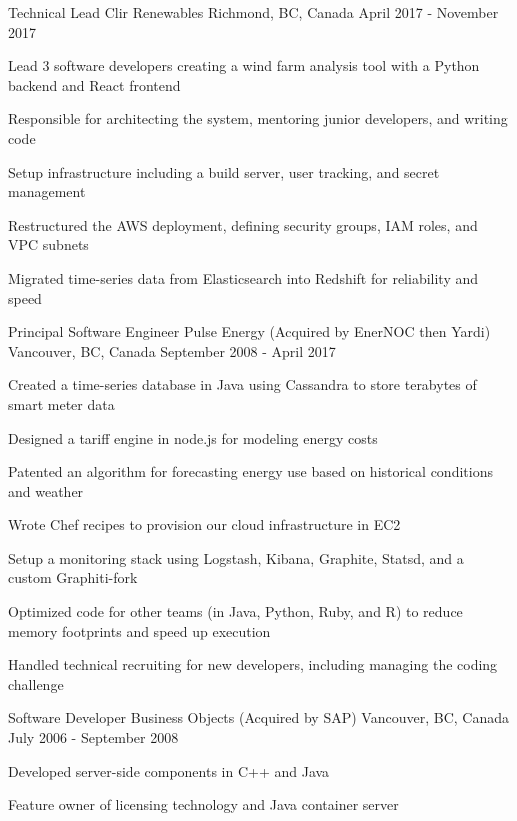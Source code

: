 \begin{cventries}
  \cventry
    {Technical Lead} %
    {Clir Renewables} %
    {Richmond, BC, Canada} %
    {April 2017 - November 2017} %
    {
      \begin{cvitems} %
        \item {Lead 3 software developers creating a wind farm analysis tool with a Python backend and React frontend}
        \item {Responsible for architecting the system, mentoring junior developers, and writing code}
        \item {Setup infrastructure including a build server, user tracking, and secret management}
        \item {Restructured the AWS deployment, defining security groups, IAM roles, and VPC subnets}
        \item {Migrated time-series data from Elasticsearch into Redshift for reliability and speed}
      \end{cvitems}
    }


  \cventry
    {Principal Software Engineer} %
    {Pulse Energy (Acquired by EnerNOC then Yardi)} %
    {Vancouver, BC, Canada} %
    {September 2008 - April 2017} %
    {
      \begin{cvitems} %
        \item {Created a time-series database in Java using Cassandra to store terabytes of smart meter data}
        \item {Designed a tariff engine in node.js for modeling energy costs}
        \item {Patented an algorithm for forecasting energy use based on historical conditions and weather}
        \item {Wrote Chef recipes to provision our cloud infrastructure in EC2}
        \item {Setup a monitoring stack using Logstash, Kibana, Graphite, Statsd, and a custom Graphiti-fork}
        \item {Optimized code for other teams (in Java, Python, Ruby, and R) to reduce memory footprints and speed up execution}
        \item {Handled technical recruiting for new developers, including managing the coding challenge}
      \end{cvitems}
    }

  \cventry
    {Software Developer} %
    {Business Objects (Acquired by SAP)} %
    {Vancouver, BC, Canada} %
    {July 2006 - September 2008} %
    {
      \begin{cvitems} %
        \item {Developed server-side components in C++ and Java}
        \item {Feature owner of licensing technology and Java container server}
      \end{cvitems}
    }

\end{cventries}

